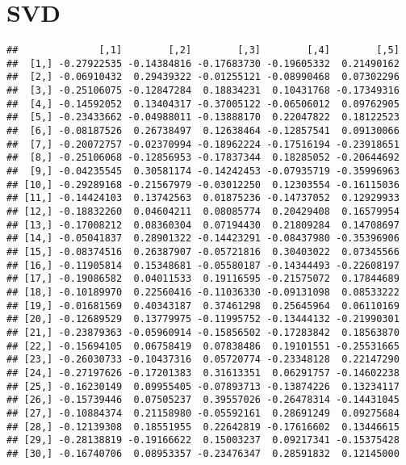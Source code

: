 \documentclass[
]{book}
\newenvironment{Shaded}{\begin{snugshade}}{\end{snugshade}}
\newcommand{\FunctionTok}[1]{\textcolor[rgb]{0.00,0.00,0.00}{#1}}
\newcommand{\NormalTok}[1]{#1}
\newcommand{\OtherTok}[1]{\textcolor[rgb]{0.56,0.35,0.01}{#1}}
\newcommand{\SpecialCharTok}[1]{\textcolor[rgb]{0.00,0.00,0.00}{#1}}
\begin{document}
\hypertarget{svd}{%
\section{SVD}\label{svd}}

\begin{Shaded}
\end{Shaded}

\begin{verbatim}
##              [,1]        [,2]        [,3]        [,4]        [,5]
##  [1,] -0.27922535 -0.14384816 -0.17683730 -0.19605332  0.21490162
##  [2,] -0.06910432  0.29439322 -0.01255121 -0.08990468  0.07302296
##  [3,] -0.25106075 -0.12847284  0.18834231  0.10431768 -0.17349316
##  [4,] -0.14592052  0.13404317 -0.37005122 -0.06506012  0.09762905
##  [5,] -0.23433662 -0.04988011 -0.13888170  0.22047822  0.18122523
##  [6,] -0.08187526  0.26738497  0.12638464 -0.12857541  0.09130066
##  [7,] -0.20072757 -0.02370994 -0.18962224 -0.17516194 -0.23918651
##  [8,] -0.25106068 -0.12856953 -0.17837344  0.18285052 -0.20644692
##  [9,] -0.04235545  0.30581174 -0.14242453 -0.07935719 -0.35996963
## [10,] -0.29289168 -0.21567979 -0.03012250  0.12303554 -0.16115036
## [11,] -0.14424103  0.13742563  0.01875236 -0.14737052  0.12929933
## [12,] -0.18832260  0.04604211  0.08085774  0.20429408  0.16579954
## [13,] -0.17008212  0.08360304  0.07194430  0.21809284  0.14708697
## [14,] -0.05041837  0.28901322 -0.14423291 -0.08437980 -0.35396906
## [15,] -0.08374516  0.26387907 -0.05721816  0.30403022  0.07345566
## [16,] -0.11905814  0.15348681 -0.05580187 -0.14344493 -0.22608197
## [17,] -0.19086582  0.04011533  0.19116595 -0.21575072  0.17844689
## [18,] -0.10189970  0.22560416 -0.11036330 -0.09131098  0.08533222
## [19,] -0.01681569  0.40343187  0.37461298  0.25645964  0.06110169
## [20,] -0.12689529  0.13779975 -0.11995752 -0.13444132 -0.21990301
## [21,] -0.23879363 -0.05960914 -0.15856502 -0.17283842  0.18563870
## [22,] -0.15694105  0.06758419  0.07838486  0.19101551 -0.25531665
## [23,] -0.26030733 -0.10437316  0.05720774 -0.23348128  0.22147290
## [24,] -0.27197626 -0.17201383  0.31613351  0.06291757 -0.14602238
## [25,] -0.16230149  0.09955405 -0.07893713 -0.13874226  0.13234117
## [26,] -0.15739446  0.07505237  0.39557026 -0.26478314 -0.14431045
## [27,] -0.10884374  0.21158980 -0.05592161  0.28691249  0.09275684
## [28,] -0.12139308  0.18551955  0.22642819 -0.17616602  0.13446615
## [29,] -0.28138819 -0.19166622  0.15003237  0.09217341 -0.15375428
## [30,] -0.16740706  0.08953357 -0.23476347  0.28591832  0.12145000
\end{verbatim}
\end{document}

